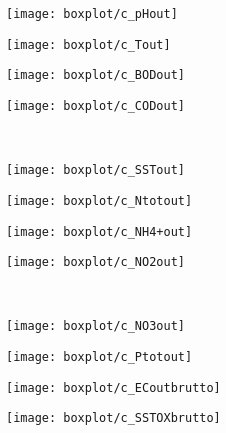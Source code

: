 \begin{figure}[h]
	\begin{subfigure}{0.24\textwidth}
		\texttt{[image: boxplot/c\_pHout]}	\centering
	\end{subfigure}
	\begin{subfigure}{0.24\textwidth}
		\texttt{[image: boxplot/c\_Tout]}	\centering
	\end{subfigure}
	\begin{subfigure}{0.24\textwidth}
		\texttt{[image: boxplot/c\_BODout]}	\centering
	\end{subfigure}
	\begin{subfigure}{0.24\textwidth}
		\texttt{[image: boxplot/c\_CODout]}	\centering
	\end{subfigure}
	\\[1ex]
	\begin{subfigure}{0.24\textwidth}
		\texttt{[image: boxplot/c\_SSTout]}	\centering
	\end{subfigure}
	\begin{subfigure}{0.24\textwidth}
		\texttt{[image: boxplot/c\_Ntotout]}	\centering
	\end{subfigure}
	\begin{subfigure}{0.24\textwidth}
		\texttt{[image: boxplot/c\_NH4+out]}	\centering
	\end{subfigure}
	\begin{subfigure}{0.24\textwidth}
		\texttt{[image: boxplot/c\_NO2out]}	\centering
	\end{subfigure}
	\\[1ex]
	\begin{subfigure}{0.24\textwidth}
		\texttt{[image: boxplot/c\_NO3out]}	\centering
	\end{subfigure}
	\begin{subfigure}{0.24\textwidth}
		\texttt{[image: boxplot/c\_Ptotout]}	\centering
	\end{subfigure}
	\begin{subfigure}{0.24\textwidth}
		\texttt{[image: boxplot/c\_ECoutbrutto]}	\centering
	\end{subfigure}
	\begin{subfigure}{0.24\textwidth}
		\texttt{[image: boxplot/c\_SSTOXbrutto]}	\centering
	\end{subfigure}
	\\[1ex]
	\begin{subfigure}{0.24\textwidth}

\end{subfigure}
\end{figure}
